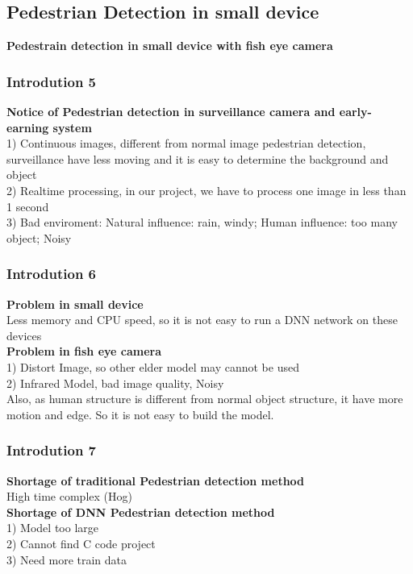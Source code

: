 \documentclass{beamer}
\begin{document}
\subsection{Pedestrian Detection in small device}
\begin{frame}
\textbf{Pedestrain detection in small device with fish eye camera}
\end{frame}



\begin{frame}
\frametitle{Introdution 5}
\textbf{Notice of Pedestrian detection in surveillance camera and early-earning system}
\\1) Continuous images, different from normal image pedestrian detection, surveillance have less moving and it is easy to determine the background and object
\\2) Realtime processing, in our project, we have to process one image in less than 1 second
\\3) Bad enviroment: Natural influence: rain, windy; Human influence: too many object; Noisy
\end{frame}



\begin{frame}
\frametitle{Introdution 6}
\textbf{Problem in small device}
\\Less memory and CPU speed, so it is not easy to run a DNN network on these devices
\\[2ex]

\textbf{Problem in fish eye camera}
\\1) Distort Image, so other elder model may cannot be used
\\2) Infrared Model, bad image quality, Noisy
\\[2ex]
Also, as human structure is different from normal object structure, it have more motion and edge. So it is not easy to build the model.
\end{frame}



\begin{frame}
\frametitle{Introdution 7}
\textbf{Shortage of traditional Pedestrian detection method}
\\High time complex (Hog)
\\[2ex]
\textbf{Shortage of DNN Pedestrian detection method}
\\1) Model too large
\\2) Cannot find C code project
\\3) Need more train data
\end{frame}
\end{document}
